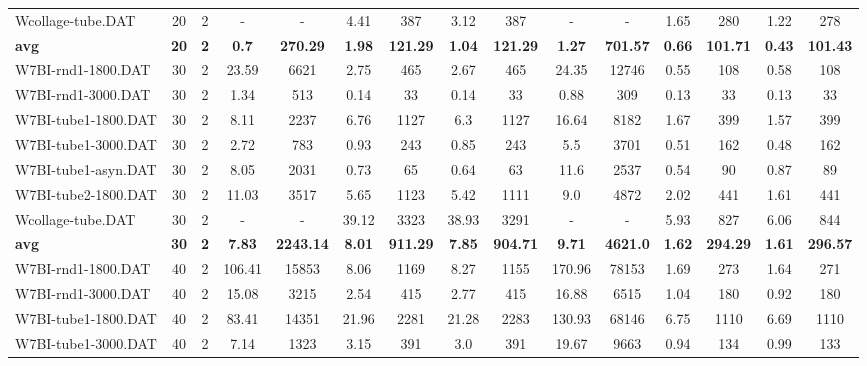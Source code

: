 \begin{table}[!ht]
{\begin{tabular}{lcccccccccccccc}
Wcollage-tube.DAT & 20 & 2 &  - &  - & 4.41 & 387 & 3.12 & 387 &  - &  - & 1.65 & 280 &  \textcolor{blue2}{1.22} & 278 \\
\cline{1-15} \textbf{avg} & \textbf{20} & \textbf{2} & \textbf{0.7} & \textbf{270.29} & \textbf{1.98} & \textbf{121.29} & \textbf{1.04} & \textbf{121.29} & \textbf{1.27} & \textbf{701.57} & \textbf{0.66} & \textbf{101.71} & \textbf{0.43} & \textbf{101.43} \\ \cline{1-15}
W7BI-rnd1-1800.DAT & 30 & 2 & 23.59 & 6621 & 2.75 & 465 & 2.67 & 465 & 24.35 & 12746 &  \textcolor{blue2}{0.55} & 108 & 0.58 & 108 \\
W7BI-rnd1-3000.DAT & 30 & 2 & 1.34 & 513 & 0.14 & 33 & 0.14 & 33 & 0.88 & 309 &  \textcolor{blue2}{0.13} & 33 &  \textcolor{blue2}{0.13} & 33 \\
W7BI-tube1-1800.DAT & 30 & 2 & 8.11 & 2237 & 6.76 & 1127 & 6.3 & 1127 & 16.64 & 8182 & 1.67 & 399 &  \textcolor{blue2}{1.57} & 399 \\
W7BI-tube1-3000.DAT & 30 & 2 & 2.72 & 783 & 0.93 & 243 & 0.85 & 243 & 5.5 & 3701 & 0.51 & 162 &  \textcolor{blue2}{0.48} & 162 \\
W7BI-tube1-asyn.DAT & 30 & 2 & 8.05 & 2031 & 0.73 & 65 & 0.64 & 63 & 11.6 & 2537 &  \textcolor{blue2}{0.54} & 90 & 0.87 & 89 \\
W7BI-tube2-1800.DAT & 30 & 2 & 11.03 & 3517 & 5.65 & 1123 & 5.42 & 1111 & 9.0 & 4872 & 2.02 & 441 &  \textcolor{blue2}{1.61} & 441 \\
Wcollage-tube.DAT & 30 & 2 &  - &  - & 39.12 & 3323 & 38.93 & 3291 &  - &  - &  \textcolor{blue2}{5.93} & 827 & 6.06 & 844 \\
\cline{1-15} \textbf{avg} & \textbf{30} & \textbf{2} & \textbf{7.83} & \textbf{2243.14} & \textbf{8.01} & \textbf{911.29} & \textbf{7.85} & \textbf{904.71} & \textbf{9.71} & \textbf{4621.0} & \textbf{1.62} & \textbf{294.29} & \textbf{1.61} & \textbf{296.57} \\ \cline{1-15}
W7BI-rnd1-1800.DAT & 40 & 2 & 106.41 & 15853 & 8.06 & 1169 & 8.27 & 1155 & 170.96 & 78153 & 1.69 & 273 &  \textcolor{blue2}{1.64} & 271 \\
W7BI-rnd1-3000.DAT & 40 & 2 & 15.08 & 3215 & 2.54 & 415 & 2.77 & 415 & 16.88 & 6515 & 1.04 & 180 &  \textcolor{blue2}{0.92} & 180 \\
W7BI-tube1-1800.DAT & 40 & 2 & 83.41 & 14351 & 21.96 & 2281 & 21.28 & 2283 & 130.93 & 68146 & 6.75 & 1110 &  \textcolor{blue2}{6.69} & 1110 \\
W7BI-tube1-3000.DAT & 40 & 2 & 7.14 & 1323 & 3.15 & 391 & 3.0 & 391 & 19.67 & 9663 &  \textcolor{blue2}{0.94} & 134 & 0.99 & 133 \\

\end{tabular}}
\end{table}
